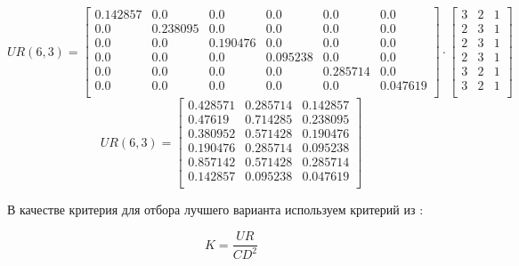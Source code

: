 $$
    UR(6,3) =
        \begin{bmatrix}
            0.142857 & 0.0      & 0.0      & 0.0      & 0.0      & 0.0      \\
            0.0      & 0.238095 & 0.0      & 0.0      & 0.0      & 0.0      \\
            0.0      & 0.0      & 0.190476 & 0.0      & 0.0      & 0.0      \\
            0.0      & 0.0      & 0.0      & 0.095238 & 0.0      & 0.0      \\
            0.0      & 0.0      & 0.0      & 0.0      & 0.285714 & 0.0      \\
            0.0      & 0.0      & 0.0      & 0.0      & 0.0      & 0.047619 \\
        \end{bmatrix}
        \cdot
        \begin{bmatrix}
            3 & 2 & 1 \\
            2 & 3 & 1 \\
            2 & 3 & 1 \\
            2 & 3 & 1 \\
            3 & 2 & 1 \\
            3 & 2 & 1 \\
        \end{bmatrix}
$$
\begin{equation}
        UR(6,3) =
        \begin{bmatrix}
            0.428571 & 0.285714 & 0.142857 \\
            0.47619  & 0.714285 & 0.238095 \\
            0.380952 & 0.571428 & 0.190476 \\
            0.190476 & 0.285714 & 0.095238 \\
            0.857142 & 0.571428 & 0.285714 \\
            0.142857 & 0.095238 & 0.047619 \\
        \end{bmatrix}
    \label{eq_cd_rez}
\end{equation}

В качестве критерия для отбора лучшего варианта используем
критерий из \cite[стр. 21]{econ_FSA}:

\begin{equation}
    K = \frac{UR}{CD^2}
    \label{eq_econ_best_var_form}
\end{equation}

